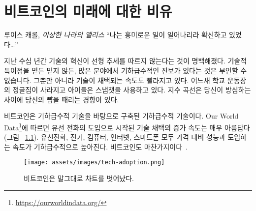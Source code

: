 \chapter{비트코인의 미래에 대한 비유}
\label{les:21}

\begin{chapquote}{루이스 캐롤, \textit{이상한 나라의 앨리스}}
	\enquote{나는 흥미로운 일이 일어나리라 확신하고 있었다\ldots}
\end{chapquote}

\begin{comment}
	In the last couple of decades, it became ap유hether you believe in the
	technological singularity or not, it is undeniable that progress is
	exponential in many fields. Not only that, but the rate at which
	technologies are being adopted is accelerating, and before you know it
	the bush in the local schoolyard is gone and your kids are using
	Snapchat instead. Exponential curves have the tendency to slap you in
	the face way before you see them coming.
\end{comment}
지난 수십 년간 기술의 혁신이 선형 추세를 따르지 않는다는 것이 명백해졌다.
기술적 특이점을 믿든 믿지 않든, 많은 분야에서 기하급수적인 진보가 있다는 것은 부인할 수 없습니다.
그뿐만 아니라 기술이 채택되는 속도도 빨라지고 있다. 
어느새 학교 운동장의 정글짐이 사라지고 아이들은 스냅챗을 사용하고 있다.
지수 곡선은 당신이 방심하는 사이에 당신의 뺨을 때리는 경향이 있다.

\begin{comment}
	Bitcoin is an exponential technology built upon exponential technologies.
	\textit{Our World in Data}\footnote{\url{https://ourworldindata.org/}}
	beautifully shows the rising speed of technological adoption, starting in 1903
	with the introduction of landlines (see Figure~\ref{fig:tech-adoption}).
	Landlines, electricity, computers, the internet, smartphones; all follow
	exponential trends in price-performance and adoption. Bitcoin does
	too~\cite{tech-adoption}.
\end{comment}
비트코인은 기하급수적 기술을 바탕으로 구축된 기하급수적 기술이다.
Our World Data\footnote{\url{https://ourworldindata.org/}}에 따르면 유선 전화의 도입으로 시작된
기술 채택의 증가 속도는 매우 아름답다(그림 ~\ref{fig:tech-adoption}).
유선전화, 전기, 컴퓨터, 인터넷, 스마트폰 모두 가격 대비 성능과 도입하는 속도가 기하급수적으로 높아진다.
비트코인도 마찬가지이다~\cite{tech-adoption}.

\begin{figure}
	\texttt{[image: assets/images/tech-adoption.png]}
	\caption{비트코인은 말그대로 차트를 벗어났다.}
	\label{fig:tech-adoption}
\end{figure}

